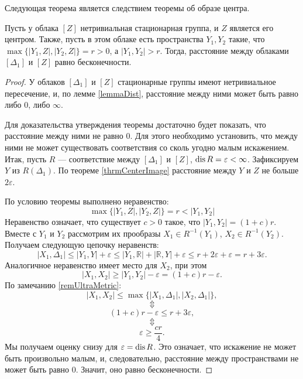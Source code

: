Следующая теорема является следствием теоремы об образе центра.
\begin{theorem}
  Пусть у облака $[Z]$ нетривиальная стационарная группа, и $Z$
  является его центром. Также, пусть в этом облаке есть пространства
  $Y_{1}, Y_{2}$
  такие, что $\max\big\{ |Y_{1},Z|, |Y_{2}, Z| \big\} = r>0$, а
  $|Y_{1}, Y_{2}|>r$. Тогда, расстояние между облаками $[\Delta_1]$ и $[Z]$
  равно бесконечности.
  \label{thrmDist}
\end{theorem}
\begin{proof}
  У облаков $[\Delta_1]$ и $[Z]$ стационарные группы имеют
  нетривиальное пересечение, и, по лемме \ref{lemmaDist},
  расстояние между ними может быть
  равно либо $0$, либо $\infty$.

  Для доказательства утверждения теоремы
  достаточно будет показать, что расстояние между ними не равно $0$.  Для этого
  необходимо установить, что между ними не может существовать соответствия со
  сколь угодно малым искажением. Итак, пусть $R$ --- соответствие между
  $[\Delta_1]$ и $[Z]$, $\operatorname{dis} R = \varepsilon < \infty$.
  Зафиксируем $Y$ из $R(\Delta_1)$. По теореме \ref{thrmCenterImage}
  расстояние между $Y$ и $Z$ не
  больше $2\varepsilon$.

  По условию теоремы выполнено неравенство:
  $$\max\big\{ |Y_{1},Z|, |Y_{2}, Z| \big\} = r < |Y_{1}, Y_{2}|$$
  Неравенство означает, что существует $c > 0$ такое, что
  $|Y_{1},Y_{2}| = (1 + c)r.$ Вместе с $Y_{1}$ и
  $ Y_{2}$ рассмотрим их прообразы $X_1 \in R^{-1}(Y_{1})$,
  $ X_2 \in R^{-1}(Y_{2})$. Получаем следующую цепочку
  неравенств:
  $$|X_1, \Delta_1| \le |Y_{1}, Y| + \varepsilon \le |Y_{1}, \mathbb{R}|
  + |\mathbb{R}, Y| +\varepsilon \le r + 2\varepsilon + \varepsilon =
  r + 3\varepsilon.$$
  Аналогичное неравенство имеет место для $X_2$, при этом
  $$|X_1, X_2|  \ge |Y_{1}, Y_{2}| - \varepsilon = (1+c)r - \varepsilon.$$
  По замечанию \ref{remUltraMetric}:
  $$|X_1, X_2| \le \max\big\{ |X_1, \Delta_1|, |X_2, \Delta_1| \big\},$$
  $$\Updownarrow$$
  $$(1+c)r - \varepsilon\le r + 3\varepsilon,$$
  $$\Updownarrow$$
  $$\varepsilon \ge \frac{cr}{4}.$$
  Мы получаем оценку снизу для $\varepsilon = \operatorname{dis} R$. Это означает, что
  искажение не может быть произвольно малым, и, следовательно, расстояние между
  пространствами не может быть равно 0. Значит, оно равно бесконечности.
\end{proof}

